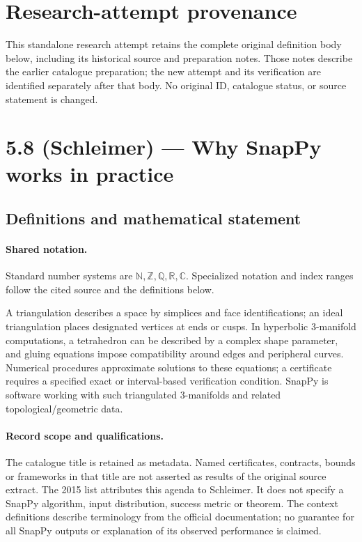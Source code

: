 \documentclass[11pt]{article}
\begin{document}
\section*{Research-attempt provenance}
This standalone research attempt retains the complete original definition body below,
including its historical source and preparation notes. Those notes describe the
earlier catalogue preparation; the new attempt and its verification are identified
separately after that body. No original ID, catalogue status, or source statement is changed.

\section{5.8 (Schleimer) — Why SnapPy works in practice}\label{statement}

\subsection{Definitions and mathematical statement}

\paragraph{Shared notation.}Standard number systems are $\mathbb N,\mathbb Z,\mathbb Q,\mathbb R,\mathbb C$. Specialized notation and index ranges follow the cited source and the definitions below.


A triangulation describes a space by simplices and face identifications; an ideal triangulation places designated vertices at ends or cusps. In hyperbolic $3$-manifold computations, a tetrahedron can be described by a complex shape parameter, and gluing equations impose compatibility around edges and peripheral curves. Numerical procedures approximate solutions to these equations; a certificate requires a specified exact or interval-based verification condition. SnapPy is software working with such triangulated $3$-manifolds and related topological/geometric data.
\paragraph{Record scope and qualifications.}
The catalogue title is retained as metadata. Named certificates, contracts, bounds or frameworks in that title are not asserted as results of the original source extract.
The 2015 list attributes this agenda to Schleimer. It does not specify a SnapPy algorithm, input distribution, success metric or theorem. The context definitions describe terminology from the official documentation; no guarantee for all SnapPy outputs or explanation of its observed performance is claimed.
\end{document}
